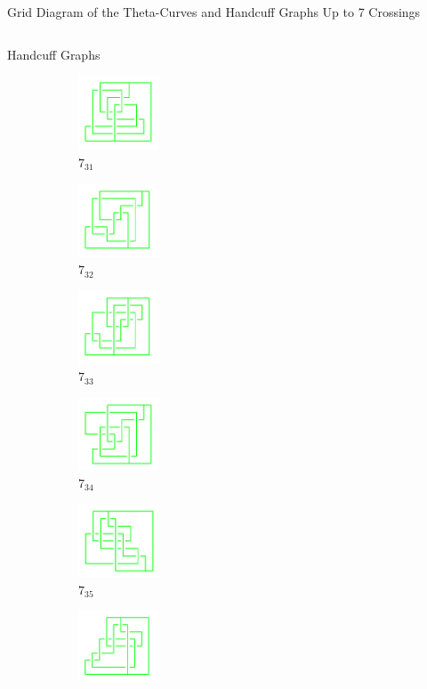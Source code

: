 \documentclass[final]{beamer}
\begin{document}
\begin{frame}[t]
\begin{alertblock}{Grid Diagram of the Theta-Curves and Handcuff Graphs Up to 7 Crossings}
\begin{columns}[t]
\begin{column}{0.3\textwidth}
\begin{alertblock}{Handcuff Graphs}
\begin{figure}
\begin{subfigure}{0.15\textwidth}
    \includegraphics[width=2.4cm]{../Midterm_Poster/grid_diagram/handcuff_7_31.png}
    \caption{$7_{31}$} 
    \end{subfigure}
    \begin{subfigure}{0.15\textwidth}
    \includegraphics[width=2.4cm]{../Midterm_Poster/grid_diagram/handcuff_7_32.png}
    \caption{$7_{32}$} 
    \end{subfigure}
    \begin{subfigure}{0.15\textwidth}
    \includegraphics[width=2.4cm]{../Midterm_Poster/grid_diagram/handcuff_7_33.png}
    \caption{$7_{33}$} 
    \end{subfigure}
    \begin{subfigure}{0.15\textwidth}
    \includegraphics[width=2.4cm]{../Midterm_Poster/grid_diagram/handcuff_7_34.png}
    \caption{$7_{34}$} 
    \end{subfigure}
    \begin{subfigure}{0.15\textwidth}
    \includegraphics[width=2.4cm]{../Midterm_Poster/grid_diagram/handcuff_7_35.png}
    \caption{$7_{35}$} 
    \end{subfigure}
    \begin{subfigure}{0.15\textwidth}
    \includegraphics[width=2.4cm]{../Midterm_Poster/grid_diagram/handcuff_7_36.png}

\end{subfigure}
\end{figure}
\end{alertblock}
\end{column}
\end{columns}
\end{alertblock}
\end{frame}
\end{document}
